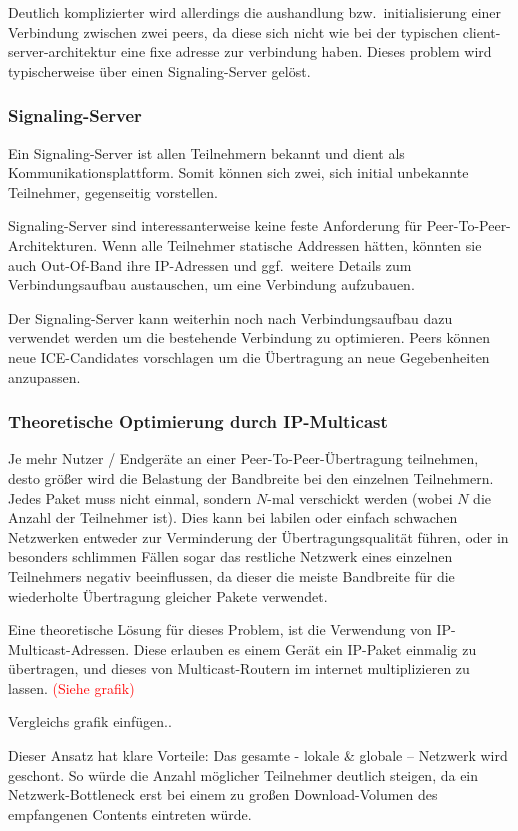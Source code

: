\documentclass{article}
\begin{document}
\begin{onecolumn}
Deutlich komplizierter wird allerdings die aushandlung bzw.\ initialisierung
einer Verbindung zwischen zwei peers, da diese sich nicht wie bei der typischen
client-server-architektur eine fixe adresse zur verbindung haben. Dieses
problem wird typischerweise über einen Signaling-Server gelöst.

\subsubsection{Signaling-Server}
Ein Signaling-Server ist allen Teilnehmern bekannt und dient als
Kommunikationsplattform. Somit können sich zwei, sich initial unbekannte
Teilnehmer, gegenseitig vorstellen.

Signaling-Server sind interessanterweise keine feste Anforderung für
Peer-To-Peer-Architekturen. Wenn alle Teilnehmer statische Addressen hätten,
könnten sie auch Out-Of-Band ihre IP-Adressen und ggf.\ weitere Details zum
Verbindungsaufbau austauschen, um eine Verbindung aufzubauen.

Der Signaling-Server kann weiterhin noch nach Verbindungsaufbau dazu verwendet
werden um die bestehende Verbindung zu optimieren. Peers können neue
ICE-Candidates vorschlagen um die Übertragung an neue Gegebenheiten anzupassen.

\subsubsection{Theoretische Optimierung durch IP-Multicast}

Je mehr Nutzer / Endgeräte an einer Peer-To-Peer-Übertragung teilnehmen, desto
größer wird die Belastung der Bandbreite bei den einzelnen Teilnehmern. Jedes
Paket muss nicht einmal, sondern $N$-mal verschickt werden (wobei $N$ die
Anzahl der Teilnehmer ist). Dies kann bei labilen oder einfach schwachen
Netzwerken entweder zur Verminderung der Übertragungsqualität führen, oder in
besonders schlimmen Fällen sogar das restliche Netzwerk eines einzelnen
Teilnehmers negativ beeinflussen, da dieser die meiste Bandbreite für die
wiederholte Übertragung gleicher Pakete verwendet.

Eine theoretische Lösung für dieses Problem, ist die Verwendung von
IP-Multicast-Adressen. Diese erlauben es einem Gerät ein IP-Paket einmalig zu
übertragen, und dieses von Multicast-Routern im internet multiplizieren zu
lassen. \textcolor{red}{(Siehe grafik)}

Vergleichs grafik einfügen..

Dieser Ansatz hat klare Vorteile: Das gesamte - lokale \& globale – Netzwerk
wird geschont. So würde die Anzahl möglicher Teilnehmer deutlich steigen, da
ein Netzwerk-Bottleneck erst bei einem zu großen Download-Volumen des
empfangenen Contents eintreten würde.


\end{onecolumn}
\end{document}
